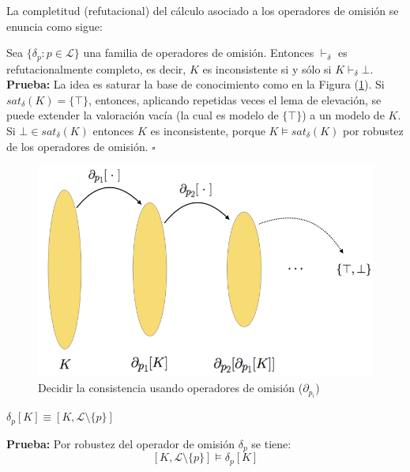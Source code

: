 La completitud (refutacional) del cálculo asociado a los operadores de omisión se enuncia como sigue:

\thm Sea $\{ \delta_p : p \in \mathcal{L} \}$ una familia de operadores de omisión. Entonces $\vdash_{\delta}$ es refutacionalmente completo, es decir, $K$ es inconsistente si y sólo si $K \vdash_{\delta} \bot$.\\

\noindent \textbf{Prueba:} La idea es saturar la base de conocimiento como en la Figura (\ref{fig:comple}). Si $sat_{\delta} (K) = \{ \top \}$, entonces, aplicando repetidas veces el lema de elevación, se puede extender la valoración vacía (la cual es modelo de $\{ \top \}$) a un modelo de $K$.\\
Si $\bot \in sat_{\delta} (K)$ entonces $K$ es inconsistente, porque $K \vDash sat_{\delta} (K)$ por robustez de los operadores de omisión. $\square$ %

\vspace{0.5cm}
\begin{figure}[h]
	\centering
		\includegraphics[scale=0.44]{imagenes/comple.png}
	\caption{Decidir la consistencia usando operadores de omisión ($\partial_{p_i}$)}
	\label{fig:comple}
\end{figure}
\vspace{0.5cm}

\cor $\delta_p [K] \equiv [K, \mathcal{L} \setminus \{ p \}]$

\noindent \textbf{Prueba:} Por robustez del operador de omisión $\delta_p$ se tiene:
$$[K, \mathcal{L} \setminus \{ p \}] \vDash \delta_p [K]$$

